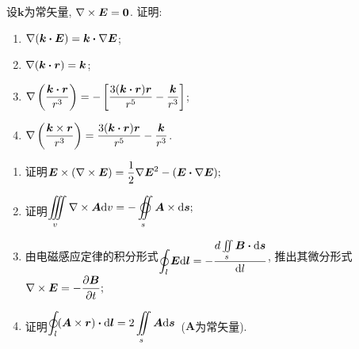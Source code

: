 \begin{yyEx}
	设$\bm{k}$为常矢量, $\nabla\times\bm{E} = \bm{0}$. 证明:
	\begin{enumerate}
		\item $\nabla(\bm{k\cdot E}) = \bm{k\cdot}\nabla\bm{E}$;
		\item $\nabla(\bm{k\cdot r}) = \bm{k}$;
		\item $\begin{lgathered}
			\grad\left( \frac{\bm{k\cdot r}}{r^3} \right) = -\left[ \frac{3(\bm{k\cdot r})\bm{r}}{r^5} - \frac{\bm{k}}{r^3} \right]
		\end{lgathered}$;
		\item $\begin{lgathered}
		\grad\left( \frac{\bm{k}\times\bm{r}}{r^3} \right) =  \frac{3(\bm{k\cdot r})\bm{r}}{r^5} - \frac{\bm{k}}{r^3}
		\end{lgathered}$.
	\end{enumerate}
\end{yyEx}

\begin{yyEx}
	\begin{enumerate}
		\item 证明$\begin{lgathered}
			\bm{E}\times(\grad\times \bm{E}) = \frac{1}{2}\grad \bm{E}^2-(\bm{E}\bm{\cdot}\grad\bm{E});
		\end{lgathered}$
		\item 证明$\begin{lgathered}
			\iiint\limits_{v}\grad\times\bm{A}\mathrm{d}v = - \varoiint\limits_s\bm{A}\times\mathrm{d}\bm{s};
		\end{lgathered}$
		\item 由电磁感应定律的积分形式$\begin{lgathered}
			\oint_l\bm{E}\mathrm{d}\bm{l} = -\frac{d\iint\limits_{s}\bm{B}\bm{\cdot}\mathrm{d}\bm{s}}{\mathrm{d}l}
		\end{lgathered}$, 推出其微分形式$\begin{lgathered}
			\grad\times\bm{E} = -\frac{\partial\bm{B}}{\partial t};
		\end{lgathered}$
		
		\item 证明$\begin{lgathered}
			\oint_l(\bm{A}\times\bm{r})\bm{\cdot}\mathrm{d}\bm{l} = 2\iint\limits_{s}\bm{A}\mathrm{d}\bm{s}
		\end{lgathered}$~($\bm{A}$为常矢量).
	\end{enumerate}
\end{yyEx}

